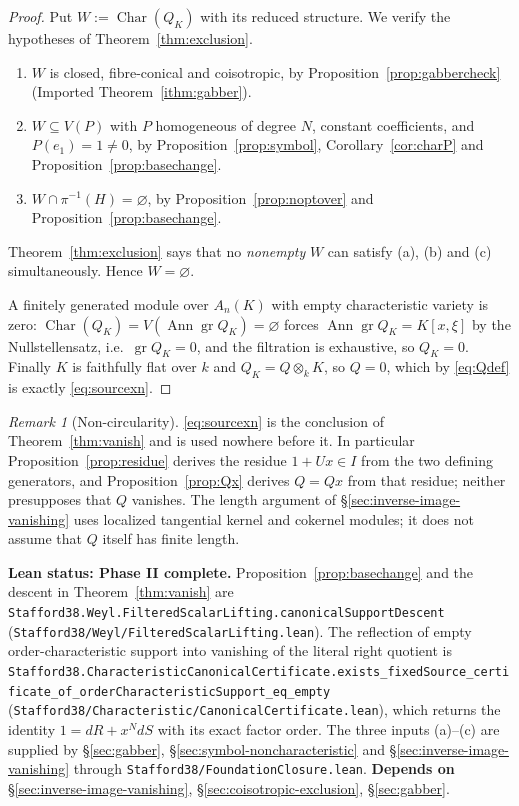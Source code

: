 \documentclass[11pt]{article}
\theoremstyle{plain}
\theoremstyle{definition}
\theoremstyle{remark}
\newtheorem{remark}[theorem]{Remark}
\theoremstyle{plain}
\newcommand{\Char}{\operatorname{Char}}
\newcommand{\gr}{\operatorname{gr}}
\newcommand{\Ann}{\operatorname{Ann}}
\begin{document}
\begin{proof}
Put $W:=\Char(Q_K)$ with its reduced structure. We verify the hypotheses of
Theorem~\ref{thm:exclusion}.
\begin{enumerate}[label=(\alph*),leftmargin=2.2em,itemsep=2pt]
\item $W$ is closed, fibre-conical and coisotropic, by
  Proposition~\ref{prop:gabbercheck} (Imported Theorem~\ref{ithm:gabber}).
\item $W\subseteq V(P)$ with $P$ homogeneous of degree $N$, constant
  coefficients, and $P(e_1)=1\neq0$, by Proposition~\ref{prop:symbol},
  Corollary~\ref{cor:charP} and Proposition~\ref{prop:basechange}.
\item $W\cap\pi^{-1}(H)=\varnothing$, by Proposition~\ref{prop:noptover} and
  Proposition~\ref{prop:basechange}.
\end{enumerate}
Theorem~\ref{thm:exclusion} says that no \emph{nonempty} $W$ can satisfy (a),
(b) and (c) simultaneously. Hence $W=\varnothing$.

A finitely generated module over $A_n(K)$ with empty characteristic variety is
zero: $\Char(Q_K)=V(\Ann\gr Q_K)=\varnothing$ forces
$\Ann\gr Q_K=K[x,\xi]$ by the Nullstellensatz, i.e.\ $\gr Q_K=0$, and the
filtration is exhaustive, so $Q_K=0$. Finally $K$ is faithfully flat over $k$
and $Q_K=Q\otimes_kK$, so $Q=0$, which by \eqref{eq:Qdef} is exactly
\eqref{eq:sourcexn}.
\end{proof}

\begin{remark}[Non-circularity]\label{rem:noncirc}
\eqref{eq:sourcexn} is the conclusion of Theorem~\ref{thm:vanish} and is used
nowhere before it. In particular Proposition~\ref{prop:residue} derives the
residue $1+Ux\in I$ from the two defining generators, and
Proposition~\ref{prop:Qx} derives $Q=Qx$ from that residue; neither presupposes
that $Q$ vanishes. The length argument of \S\ref{sec:inverse-image-vanishing}
uses localized tangential kernel and cokernel modules; it does not assume
that $Q$ itself has finite length.
\end{remark}

\begin{provbox}
\textbf{Lean status: Phase II complete.}
Proposition~\ref{prop:basechange} and the descent in
Theorem~\ref{thm:vanish} are
\texttt{Stafford38.\allowbreak Weyl.\allowbreak FilteredScalarLifting.\allowbreak canonicalSupportDescent}
(\texttt{Stafford38/Weyl/FilteredScalarLifting.lean}). The reflection of empty
order-characteristic support into vanishing of the literal right quotient is
\texttt{Stafford38.\allowbreak CharacteristicCanonicalCertificate.\allowbreak exists\_fixedSource\_certificate\_of\_orderCharacteristicSupport\_eq\_empty}
(\texttt{Stafford38/Characteristic/CanonicalCertificate.lean}), which returns
the identity $1=dR+x^NdS$ with its exact factor order. The three inputs
(a)--(c) are supplied by \S\ref{sec:gabber},
\S\ref{sec:symbol-noncharacteristic} and \S\ref{sec:inverse-image-vanishing}
through \texttt{Stafford38/FoundationClosure.lean}.
\textbf{Depends on} \S\ref{sec:inverse-image-vanishing},
\S\ref{sec:coisotropic-exclusion}, \S\ref{sec:gabber}.
\end{provbox}
\end{document}
